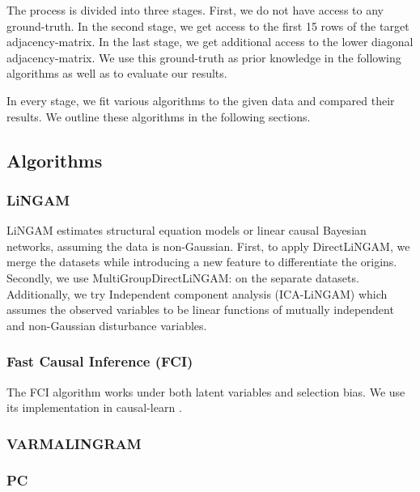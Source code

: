 \documentclass{article}
\begin{document}
    The process is divided into three stages. First, we do not have access to any ground-truth. In the second stage, we get access to the first 15 rows of the target adjacency-matrix. In the last stage, we get additional access to the lower diagonal adjacency-matrix. We use this ground-truth as prior knowledge in the following algorithms as well as to evaluate our results.

    In every stage, we fit various algorithms to the given data and compared their results. We outline these algorithms in the following sections.

    \subsection{Algorithms}
    
    

    \subsubsection{LiNGAM}
    LiNGAM estimates structural equation models or linear causal Bayesian networks, assuming the data is non-Gaussian.
    First, to apply DirectLiNGAM\cite{lingam}, we merge the datasets while introducing a new feature to differentiate the origins. 
    Secondly, we use MultiGroupDirectLiNGAM: \cite{multilingam} on the separate datasets.
    Additionally, we try Independent component analysis (ICA-LiNGAM)\cite{ICALINGAM} which assumes the observed variables to be linear functions of mutually independent and non-Gaussian disturbance variables.

    \subsubsection{Fast Causal Inference (FCI)}
    The FCI algorithm \cite{FCI} works under both latent variables and selection bias. We use its implementation in causal-learn \cite{Causallearn}.

    \subsubsection{VARMALINGRAM}

    \subsubsection{PC}
    
\end{document}
